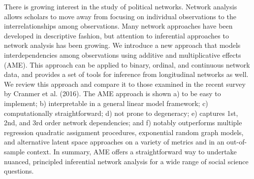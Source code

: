 There is growing interest in the study of political networks. Network analysis allows scholars to move away from focusing on individual observations to the interrelationships among observations. Many network approaches have been developed in descriptive fashion, but attention to inferential approaches to network analysis has been growing. We introduce a new approach that models interdependencies among observations using additive and multiplicative effects (AME). This approach can be applied to binary, ordinal, and continuous network data, and provides a set of tools for inference from longitudinal networks as well. We review this approach and compare it to those examined in the recent survey by Cranmer et al. (2016).  The AME approach is shown a) to be easy to implement; b) interpretable in a general linear model framework; c) computationally straightforward; d) not prone to degeneracy; e) captures 1st, 2nd, and 3rd order network dependencies; and f) notably outperforms multiple regression quadratic assignment procedures, exponential random graph models, and alternative latent space approaches on a variety of metrics and in an out-of-sample context. In summary, AME offers a straightforward way to undertake nuanced, principled inferential network analysis for a wide range of social science questions. 

